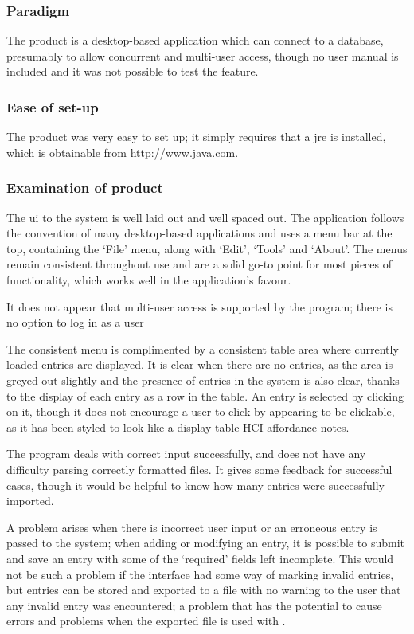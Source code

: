 \subsubsection{Paradigm}
The product is a desktop-based application which can connect to a database, presumably to allow concurrent and multi-user access, though no user manual is included and it was not possible to test the feature.

\subsubsection{Ease of set-up}
The product was very easy to set up; it simply requires that a \gls{jre} is installed, which is obtainable from \url{http://www.java.com}.

\subsubsection{Examination of product}
The \gls{ui} to the system is well laid out and well spaced out. The application follows the convention of many desktop-based applications and uses a menu bar at the top, containing the `File' menu, along with `Edit', `Tools' and `About'.  The menus remain consistent throughout use and are a solid go-to point for most pieces of functionality, which works well in the application's favour.

It does not appear that multi-user access is supported by the program; there is no option to log in as a user

The consistent menu is complimented by a consistent table area where currently loaded entries are displayed.  It is clear when there are no entries, as the area is greyed out slightly and the presence of entries in the system is also clear, thanks to the display of each entry as a row in the table.  An entry is selected by clicking on it, though it does not encourage a user to click by appearing to be clickable, as it has been styled to look like a display table  \revisit HCI affordance notes.

The program deals with correct input successfully, and does not have any difficulty parsing correctly formatted files.  It gives some feedback for successful cases, though it would be helpful to know how many entries were successfully imported. 

A problem arises when there is incorrect user input or an erroneous entry is passed to the system; when adding or modifying an entry, it is possible to submit and save an entry with some of the `required' fields left incomplete.  This would not be such a problem if the interface had some way of marking invalid entries, but entries can be stored and exported to a file with no warning to the user that any invalid entry was encountered; a problem that has the potential to cause errors and problems when the exported file is used with \bibtex{}.

